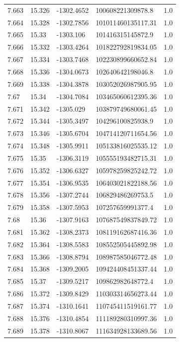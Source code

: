 \begin{tabular}{lllll}
7.663 & 15.326 & -1302.4652 & 100608221309878.8 & 1.0 \\
7.664 & 15.328 & -1302.7856 & 101011460135117.31 & 1.0 \\
7.665 & 15.33 & -1303.106 & 101416315145872.9 & 1.0 \\
7.666 & 15.332 & -1303.4264 & 101822792819834.05 & 1.0 \\
7.667 & 15.334 & -1303.7468 & 102230899660652.84 & 1.0 \\
7.668 & 15.336 & -1304.0673 & 102640642198046.8 & 1.0 \\
7.669 & 15.338 & -1304.3878 & 103052026987905.95 & 1.0 \\
7.67 & 15.34 & -1304.7084 & 103465060612395.36 & 1.0 \\
7.671 & 15.342 & -1305.029 & 103879749680061.45 & 1.0 \\
7.672 & 15.344 & -1305.3497 & 104296100825938.9 & 1.0 \\
7.673 & 15.346 & -1305.6704 & 104714120711654.56 & 1.0 \\
7.674 & 15.348 & -1305.9911 & 105133816025535.12 & 1.0 \\
7.675 & 15.35 & -1306.3119 & 105555193482715.31 & 1.0 \\
7.676 & 15.352 & -1306.6327 & 105978259825242.72 & 1.0 \\
7.677 & 15.354 & -1306.9535 & 106403021822188.56 & 1.0 \\
7.678 & 15.356 & -1307.2744 & 106829486269753.5 & 1.0 \\
7.679 & 15.358 & -1307.5953 & 107257659991377.4 & 1.0 \\
7.68 & 15.36 & -1307.9163 & 107687549837849.72 & 1.0 \\
7.681 & 15.362 & -1308.2373 & 108119162687416.36 & 1.0 \\
7.682 & 15.364 & -1308.5583 & 108552505445892.98 & 1.0 \\
7.683 & 15.366 & -1308.8794 & 108987585046772.48 & 1.0 \\
7.684 & 15.368 & -1309.2005 & 109424408451337.44 & 1.0 \\
7.685 & 15.37 & -1309.5217 & 109862982648772.4 & 1.0 \\
7.686 & 15.372 & -1309.8429 & 110303314656273.44 & 1.0 \\
7.687 & 15.374 & -1310.1641 & 110745411519161.77 & 1.0 \\
7.688 & 15.376 & -1310.4854 & 111189280310997.36 & 1.0 \\
7.689 & 15.378 & -1310.8067 & 111634928133689.56 & 1.0 \\

\end{tabular}
